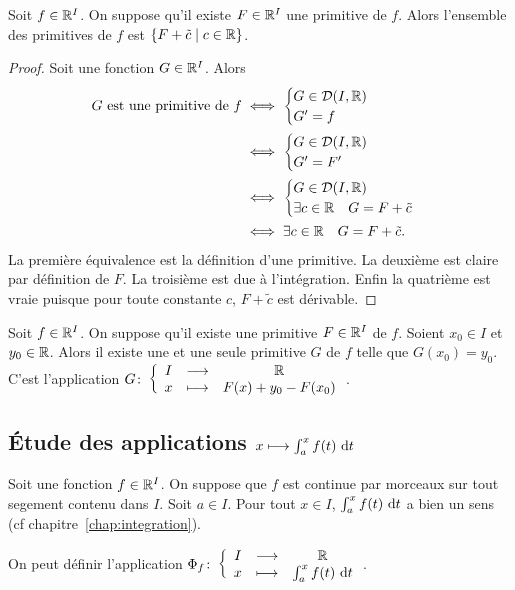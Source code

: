 \begin{theo}
  Soit \(f \in \mathbb{R}^I\). On suppose qu'il existe \(F \in \mathbb{R}^I\) une primitive de \(f\). Alors l'ensemble des primitives de \(f\) est \(\left\{F+\tilde{c}\mathrel{}\middle|\mathrel{}c \in \mathbb{R}\right\}\).
\end{theo}
\begin{proof}
  Soit une fonction \(G \in \mathbb{R}^I\). Alors
  \begin{align}
    G \text{~est une primitive de~} f &\iff \begin{cases} G \in \mathcal{D}(I,\mathbb{R}) \\ G'=f \end{cases} \\
    &\iff \begin{cases} G \in \mathcal{D}(I,\mathbb{R}) \\ G'=F' \end{cases} \\ 
    &\iff \begin{cases} G \in \mathcal{D}(I,\mathbb{R}) \\ \exists c \in \mathbb{R} \quad G=F+\tilde{c} \end{cases} \\
    &\iff \exists c \in \mathbb{R} \quad G=F+\tilde{c}.
   \end{align}
   La première équivalence est la définition d'une primitive. La deuxième est claire par définition de \(F\). La troisième est due à l'intégration. Enfin la quatrième est vraie puisque pour toute constante \(c\), \(F+\tilde{c}\) est dérivable.
\end{proof}

\begin{corth}
  Soit \(f \in \mathbb{R}^I\). On suppose qu'il existe une primitive \(F \in \mathbb{R}^I\) de \(f\). Soient \(x_0 \in I\) et \(y_0 \in \mathbb{R}\). Alors il existe une et une seule primitive \(G\) de \(f\) telle que \(G(x_0)=y_0\). C'est l'application \(G\colon \left\{\begin{array}{ccc} I & \longrightarrow &\mathbb{R}\\ x & \longmapsto & F(x)+y_0-F(x_0) \end{array} \right.\).
\end{corth}

\subsection{Étude des applications \(x \longmapsto \int_a^x f(t)\,\mathop{}\mathopen{}\mathrm{d} t\)}

Soit une fonction \(f \in \mathbb{R}^I\). On suppose que \(f\) est continue par morceaux sur tout segement contenu dans \(I\). Soit \(a \in I\). Pour tout \(x \in I\), \(\int_a^xf(t)\,\mathop{}\mathopen{}\mathrm{d} t\) a bien un sens (cf chapitre~\ref{chap:integration}).

On peut définir l'application \(\Phi_f\colon \left\{\begin{array}{ccc} I & \longrightarrow &\mathbb{R}\\ x & \longmapsto & \int_a^x f(t)\,\mathop{}\mathopen{}\mathrm{d} t \end{array} \right.\).

